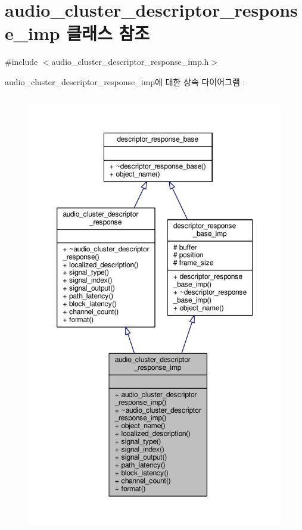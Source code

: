 \hypertarget{classavdecc__lib_1_1audio__cluster__descriptor__response__imp}{}\section{audio\+\_\+cluster\+\_\+descriptor\+\_\+response\+\_\+imp 클래스 참조}
\label{classavdecc__lib_1_1audio__cluster__descriptor__response__imp}


{\ttfamily \#include $<$audio\+\_\+cluster\+\_\+descriptor\+\_\+response\+\_\+imp.\+h$>$}



audio\+\_\+cluster\+\_\+descriptor\+\_\+response\+\_\+imp에 대한 상속 다이어그램 \+: 
\nopagebreak
\begin{figure}[H]
\begin{center}
\leavevmode
\includegraphics[height=550pt]{classavdecc__lib_1_1audio__cluster__descriptor__response__imp__inherit__graph}
\end{center}
\end{figure}


